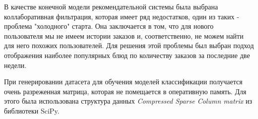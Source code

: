 В качестве конечной модели рекомендательной системы была выбрана коллаборативная
фильтрация, которая имеет ряд недостатков, один из таких - проблема "холодного"
старта. Она заключается в том, что для нового пользователя мы не имеем истории заказов
и, соответственно, не можем найти для него похожих пользователей. Для решения этой
проблемы был выбран подход отображения наиболее популярных блюд по количеству заказов
за последние две недели.

При генерировании датасета для обучения моделей классификации получается очень
разреженная матрица, которая не помещается в оперативную память. Для этого была
использована структура данных \textit{Compressed Sparse Column matrix} из
библиотеки SciPy.
